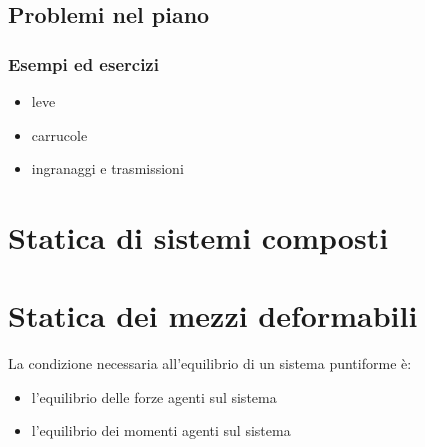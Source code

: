 \documentclass[letterpaper,10pt,italian]{jupyterBook}
\begin{document}
\subsection{Problemi nel piano}
\label{\detokenize{ch/mechanics/statics-rigid:problemi-nel-piano}}

\subsubsection{Esempi ed esercizi}
\label{\detokenize{ch/mechanics/statics-rigid:esempi-ed-esercizi}}\begin{itemize}
\item {} 
\sphinxAtStartPar
leve

\item {} 
\sphinxAtStartPar
carrucole

\item {} 
\sphinxAtStartPar
ingranaggi e trasmissioni

\end{itemize}

\sphinxstepscope


\section{Statica di sistemi composti}
\label{\detokenize{ch/mechanics/statics-composite:statica-di-sistemi-composti}}\label{\detokenize{ch/mechanics/statics-composite:physics-hs-statics-composite}}\label{\detokenize{ch/mechanics/statics-composite::doc}}
\sphinxstepscope


\section{Statica dei mezzi deformabili}
\label{\detokenize{ch/mechanics/statics-fluid:statica-dei-mezzi-deformabili}}\label{\detokenize{ch/mechanics/statics-fluid:physics-hs-mechanics-statics-fluid}}\label{\detokenize{ch/mechanics/statics-fluid::doc}}
\sphinxAtStartPar
La condizione necessaria all’equilibrio di un sistema puntiforme è:
\begin{itemize}
\item {} 
\sphinxAtStartPar
l’equilibrio  delle forze agenti sul sistema

\item {} 
\sphinxAtStartPar
l’equilibrio  dei momenti agenti sul sistema

\end{itemize}
\end{document}
